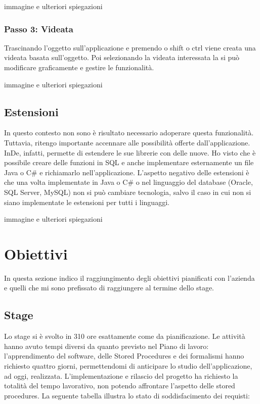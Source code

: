 \todo immagine e ulteriori spiegazioni

\subsubsection{Passo 3: Videata}
Trascinando l'oggetto sull'applicazione e premendo o shift o ctrl viene creata una videata basata sull'oggetto. Poi selezionando la videata interessata la si può modificare graficamente e gestire le funzionalità.


\todo immagine e ulteriori spiegazioni

\subsection{Estensioni}
In questo contesto non sono è risultato necessario adoperare questa funzionalità. Tuttavia, ritengo importante accennare alle possibilità offerte dall'applicazione. InDe, infatti, permette di estendere le sue librerie con delle nuove. Ho visto che è possibile creare delle funzioni in SQL e anche implementare esternamente un file Java o C\# e richiamarlo nell'applicazione. 
L'aspetto negativo delle estensioni è che una volta implementate in Java o C\# o nel linguaggio del database (Oracle, SQL Server, MySQL) non si può cambiare tecnologia, salvo il caso in cui non si siano implementate le estensioni per tutti i linguaggi.

\todo immagine e ulteriori spiegazioni

\section{Obiettivi}
In questa sezione indico il raggiungimento degli obiettivi pianificati con l'azienda e quelli che mi sono prefissato di raggiungere al termine dello stage.

\subsection{Stage}
Lo stage si è svolto in 310 ore esattamente come da pianificazione. Le attività hanno avuto tempi diversi da quanto previsto nel Piano di lavoro: l'apprendimento del software, delle Stored Procedures e dei formalismi hanno richiesto quattro giorni, permettendomi di anticipare lo studio dell'applicazione, ad oggi, realizzata.  L'implementazione e rilascio del progetto ha richiesto la totalità del tempo lavorativo, non potendo affrontare l'aspetto delle stored procedures. 
La seguente tabella illustra lo stato di soddisfacimento dei requisti:

